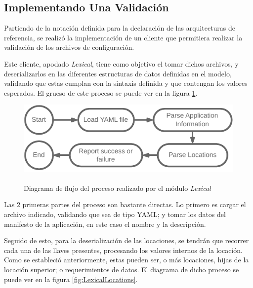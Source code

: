 \subsection{Implementando Una Validación} \label{sec:validation}


Partiendo de la notación definida para la declaración de las arquitecturas de referencia, se realizó la implementación de un cliente que permitiera realizar la validación de los archivos de configuración.

Este cliente, apodado \textit{Lexical}, tiene como objetivo el tomar dichos archivos, y deserializarlos en las diferentes estructuras de datos definidas en el modelo, validando que estas cumplan con la sintaxis definida y que contengan los valores esperados. El grueso de este proceso se puede ver en la figura \ref*{fig:LexicalFlow}.

\begin{figure}[ht]
    \centering
    \caption{\\Diagrama de flujo del proceso realizado por el módulo \textit{Lexical}}
    \label{fig:LexicalFlow}
    \vspace{2mm}
    \includegraphics[width=0.75\linewidth]{images/LexicalFlow.pdf}
\end{figure}

Las 2 primeras partes del proceso son bastante directas. Lo primero es cargar el archivo indicado, validando que sea de tipo YAML; y tomar los datos del manifesto de la aplicación, en este caso el nombre y la descripción.

Seguido de esto, para la deserialización de las locaciones, se tendrán que recorrer cada una de las llaves presentes, procesando los valores internos de la locación. Como se estableció anteriormente, estas pueden ser, o más locaciones, hijas de la locación superior; o requerimientos de datos. El diagrama de dicho proceso se puede ver en la figura \ref{fig:LexicalLocations}.


